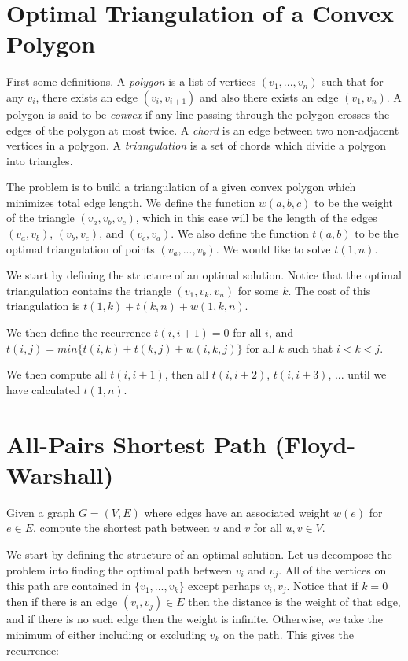 \section{Optimal Triangulation of a Convex Polygon}


First some definitions.  A \emph{polygon} is a list of vertices
$(v_1,...,v_n)$ such that for any $v_i$, there exists an edge
$(v_i,v_{i+1})$ and also there exists an edge $(v_1,v_n)$.  A polygon
is said to be \emph{convex} if any line passing through the polygon
crosses the edges of the polygon at most twice.  A \emph{chord} is an
edge between two non-adjacent vertices in a polygon.  A
\emph{triangulation} is a set of chords which divide a polygon into
triangles.

The problem is to build a triangulation of a given convex polygon
which minimizes total edge length.  We define the function $w(a,b,c)$
to be the weight of the triangle $(v_a,v_b,v_c)$, which in this case
will be the length of the edges $(v_a,v_b)$, $(v_b,v_c)$, and
$(v_c,v_a)$.  We also define the function $t(a,b)$ to be the optimal
triangulation of points $(v_a,...,v_b)$.  We would like to solve
$t(1,n)$.

We start by defining the structure of an optimal solution.  Notice
that the optimal triangulation contains the triangle $(v_1,v_k,v_n)$
for some $k$.  The cost of this triangulation is $t(1,k) + t(k,n) +
w(1,k,n)$.

We then define the recurrence $t(i,i+1) = 0$ for all $i$, and $t(i,j)
= min \{ t(i,k) + t(k,j) + w(i,k,j) \}$ for all $k$ such that $i < k < j$.

We then compute all $t(i,i+1)$, then all $t(i,i+2)$, $t(i,i+3)$,
... until we have calculated $t(1,n)$.

\hypertarget{sec:floyd_warshall}{\section{All-Pairs Shortest Path
    (Floyd-Warshall)}}

Given a graph $G=(V,E)$ where edges have an associated weight $w(e)$
for $e \in E$, compute the shortest path between $u$ and $v$ for all
$u,v \in V$.

We start by defining the structure of an optimal solution.  Let us
decompose the problem into finding the optimal path between $v_i$ and
$v_j$.  All of the vertices on this path are contained in $\{
v_1,...,v_k \}$ except perhaps $v_i,v_j$.  Notice that if $k=0$ then
if there is an edge $(v_i,v_j) \in E$ then the distance is the weight
of that edge, and if there is no such edge then the weight is
infinite.  Otherwise, we take the minimum of either including or
excluding $v_k$ on the path.  This gives the recurrence:

